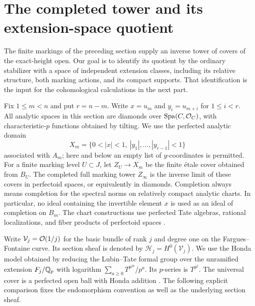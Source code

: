 \section{The completed tower and its extension-space quotient}
\label{sec:completed-tower}

The finite markings of the preceding section supply an inverse tower
of covers of the exact-height open. Our goal is to identify its quotient
by the ordinary stabilizer with a space of independent extension
classes, including its relative structure, both marking actions, and
its compact supports. That identification is the input for the
cohomological calculations in the next part.

Fix $1\leq m<n$ and put $r=n-m$. Write $x=u_m$ and
$y_i=u_{m+i}$ for $1\leq i<r$. All analytic spaces in this
section are diamonds over $\operatorname{Spa}(C,\mathcal O_C)$, with characteristic-$p$
functions obtained by tilting. We use the perfected analytic domain
\[
 X_m=\{0<|x|<1,\ |y_1|,\ldots,|y_{r-1}|<1\}
\]
associated with $A_m$; here and below an empty list of $y$-coordinates
is permitted. For a finite marking level $U\subset J$, let $Z_U\to X_m$
be the finite \'{e}tale cover obtained from $B_U$. The completed full
marking tower $Z_\infty$ is the inverse limit of these covers in
perfectoid spaces, or equivalently in diamonds. Completion always means
completion for the spectral norms on relatively compact analytic charts.
In particular, no ideal containing the invertible element $x$ is used
as an ideal of completion on $B_m$.
The chart constructions use perfected Tate algebras, rational
localizations, and fiber products of perfectoid spaces
\citep[Proposition~5.20, Theorem~6.3(i)--(ii), and
Proposition~6.18]{scholzePerfectoid2012}.

Write $\mathcal V_j=\mathcal O(1/j)$ for the basic bundle of rank $j$ and
degree one on the Fargues--Fontaine curve. Its section sheaf is denoted
by $\mathcal H_j=H^0(\mathcal V_j)$. We use the Honda model obtained
by reducing the Lubin--Tate formal group over the unramified extension
$F_j/\mathbb Q_p$ with logarithm
$\sum_{a\geq0}T^{p^{ja}}/p^a$. Its $p$-series is $T^{p^j}$.
The universal cover is a perfected open ball with Honda addition
\citep[Proposition~3.1.3]{scholzeWeinstein2013}.
The following explicit comparison fixes the endomorphism convention
as well as the underlying section sheaf.


